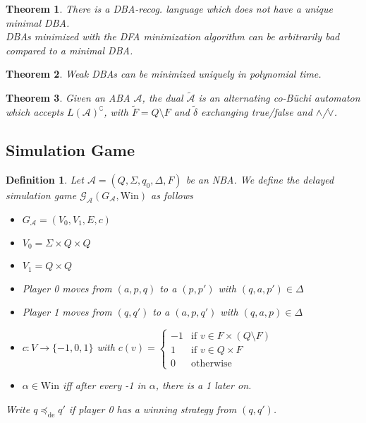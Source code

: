 \documentclass{article}
\newtheorem{theorem}{Theorem}[section]
\newtheorem{definition}{Definition}
\begin{document}
\begin{theorem}
	There is a DBA-recog. language which does not have a unique minimal DBA. \\
	DBAs minimized with the DFA minimization algorithm can be arbitrarily bad compared to a minimal DBA.
\end{theorem}

\begin{theorem}
	Weak DBAs can be minimized uniquely in polynomial time.
\end{theorem}

\begin{theorem}
	Given an ABA $\mathcal{A}$, the dual $\tilde{\mathcal{A}}$ is an alternating co-Büchi automaton which accepts $L(\mathcal{A})^\complement$, with $\tilde{F} = Q \setminus F$ and $\tilde{\delta}$ exchanging true/false and $\land$/$\lor$.
\end{theorem}

\subsection{Simulation Game}
\begin{definition}
	Let $\mathcal{A} = (Q, \Sigma, q_0, \Delta, F)$ be an NBA. We define the delayed simulation game $\mathcal{G}_\mathcal{A}(G_\mathcal{A}, \text{Win})$ as follows
	\begin{itemize}
		\item $G_\mathcal{A} = (V_0, V_1, E, c)$ 
		\item $V_0 = \Sigma \times Q \times Q$
		\item $V_1 = Q \times Q$
		\item Player 0 moves from $(a, p, q)$ to a $(p, p')$ with $(q, a, p') \in \Delta$
		\item Player 1 moves from $(q, q')$ to a $(a, p, q')$ with $(q, a, p) \in \Delta$
		\item $c : V \rightarrow \{-1, 0, 1\}$ with $c(v) = \begin{cases} -1 & \text{if } v \in F \times (Q \setminus F) \\ 1 & \text{if } v \in Q \times F \\ 0 & \text{otherwise} \end{cases}$
		\item $\alpha \in \text{Win}$ iff after every -1 in $\alpha$, there is a 1 later on.
	\end{itemize}
	
	Write $q \preceq_\text{de} q'$ if player 0 has a winning strategy from $(q, q')$.
\end{definition}
\end{document}
